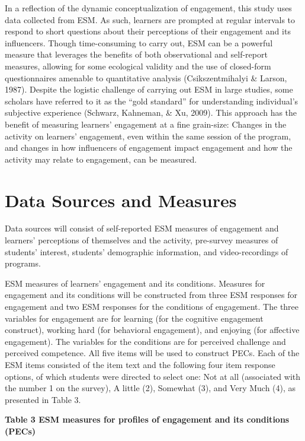 \documentclass[]{msu-thesis}
\theoremstyle{definition}
\theoremstyle{definition}
\theoremstyle{definition}
\theoremstyle{remark}
\begin{document}
In a reflection of the dynamic conceptualization of engagement, this
study uses data collected from ESM. As such, learners are prompted at
regular intervals to respond to short questions about their perceptions
of their engagement and its influencers. Though time-consuming to carry
out, ESM can be a powerful measure that leverages the benefits of both
observational and self-report measures, allowing for some ecological
validity and the use of closed-form questionnaires amenable to
quantitative analysis (Csikszentmihalyi \& Larson, 1987). Despite the
logistic challenge of carrying out ESM in large studies, some scholars
have referred to it as the ``gold standard'' for understanding
individual's subjective experience (Schwarz, Kahneman, \& Xu, 2009).
This approach has the benefit of measuring learners' engagement at a
fine grain-size: Changes in the activity on learners' engagement, even
within the same session of the program, and changes in how influencers
of engagement impact engagement and how the activity may relate to
engagement, can be measured.

\section{Data Sources and Measures}\label{data-sources-and-measures}

Data sources will consist of self-reported ESM measures of engagement
and learners' perceptions of themselves and the activity, pre-survey
measures of students' interest, students' demographic information, and
video-recordings of programs.

ESM measures of learners' engagement and its conditions. Measures for
engagement and its conditions will be constructed from three ESM
responses for engagement and two ESM responses for the conditions of
engagement. The three variables for engagement are for learning (for the
cognitive engagement construct), working hard (for behavioral
engagement), and enjoying (for affective engagement). The variables for
the conditions are for perceived challenge and perceived competence. All
five items will be used to construct PECs. Each of the ESM items
consisted of the item text and the following four item response options,
of which students were directed to select one: Not at all (associated
with the number 1 on the survey), A little (2), Somewhat (3), and Very
Much (4), as presented in Table 3.

\textbf{Table 3 ESM measures for profiles of engagement and its
conditions (PECs)}
\end{document}
